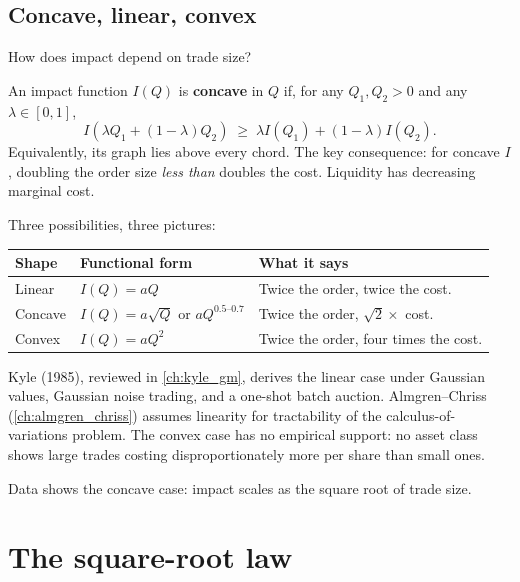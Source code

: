 \subsection{Concave, linear, convex}
\label{subsec:concave_linear}

How does impact depend on trade size?

\begin{definition}
\label{def:concave_impact}
An impact function $I(Q)$ is \textbf{concave} in $Q$ if, for any
$Q_1, Q_2 > 0$ and any $\lambda \in [0,1]$,
\[
  I(\lambda Q_1 + (1 - \lambda) Q_2) \;\ge\; \lambda I(Q_1) + (1-\lambda)I(Q_2).
\]
Equivalently, its graph lies above every chord. The key consequence:
for concave $I$, doubling the order size \emph{less than} doubles
the cost. Liquidity has decreasing marginal cost.
\end{definition}

Three possibilities, three pictures:

\begin{center}
\begin{tabular}{lll}
\toprule
Shape & Functional form & What it says \\
\midrule
Linear  & $I(Q) = aQ$            & Twice the order, twice the cost. \\
Concave & $I(Q) = a\sqrt{Q}$ or $aQ^{0.5\text{--}0.7}$
                                 & Twice the order, $\sqrt{2} \times$ cost. \\
Convex  & $I(Q) = aQ^2$          & Twice the order, four times the cost. \\
\bottomrule
\end{tabular}
\end{center}

Kyle (1985), reviewed in \cref{ch:kyle_gm}, derives the linear case
under Gaussian values, Gaussian noise trading, and a one-shot batch
auction. Almgren--Chriss (\cref{ch:almgren_chriss}) assumes linearity
for tractability of the calculus-of-variations problem. The convex
case has no empirical support: no asset class shows large trades
costing disproportionately more per share than small ones.

Data shows the concave case: impact scales as the square root of
trade size.

\section{The square-root law}
\label{sec:sqrt_law}

